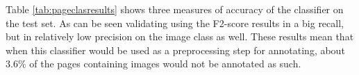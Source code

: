 Table \ref{tab:pageclasresults} shows three measures of accuracy of the
classifier on the test set. As can be seen validating using the F2-score
results in a big recall, but in relatively low precision on the image
class as well. These results mean that when this classifier would be used as a
preprocessing step for annotating, about $3.6\%$ of the pages containing images
would not be annotated as such.



